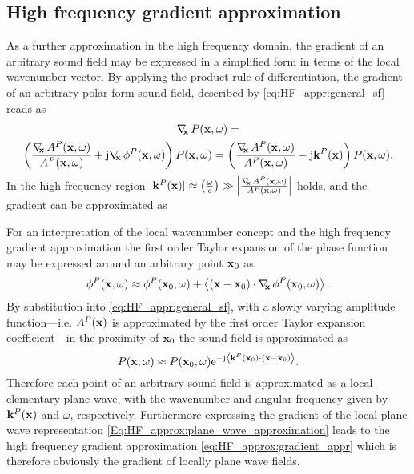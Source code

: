 \subsection{High frequency gradient approximation}
As a further approximation in the high frequency domain, the gradient of an arbitrary sound field may be expressed in a simplified form in terms of the local wavenumber vector.
By applying the product rule of differentiation, the gradient of an arbitrary polar form sound field, described by \eqref{eq:HF_appr:general_sf} reads as
\begin{multline}
\Dx P(\vx,\omega) = \\ \left(  \frac{\Dx A^P(\vx,\omega)}{A^P(\vx,\omega)} + \ti \Dx \phi^P(\vx,\omega) \right) P(\vx,\omega) =  \left(  \frac{\Dx A^P(\vx,\omega)}{A^P(\vx,\omega)} - \ti \vk^P(\vx) \right) P(\vx,\omega).
\end{multline}
In the high frequency region $|\mathbf{k}^P(\mathbf{x})| \approx \left( \frac{\omega}{c} \right) \gg \left| \frac{ \nabla_{\!\!\mathbf{x}}\, A^P(\mathbf{x},\omega)}{A^P(\mathbf{x},\omega)} \right|$ holds, and the gradient can be approximated as

\vspace{3mm}
For an interpretation of the local wavenumber concept and the high frequency gradient approximation the first order Taylor expansion of the phase function may be expressed around an arbitrary point $\mathbf{x}_0$ as
\begin{equation}
\phi^P(\mathbf{x},\omega) \approx \phi^P(\mathbf{x}_0,\omega) + \left< (\mathbf{x}-\mathbf{x}_0) \cdot \nabla_{\!\!\mathbf{x}}\, \phi^P(\mathbf{x}_0,\omega) \right>.
\end{equation}
By substitution into \eqref{eq:HF_appr:general_sf}, with a slowly varying amplitude function---i.e. $A^P(\mathbf{x})$ is approximated by the first order Taylor expansion coefficient---in the proximity of $\mathbf{x}_0$ the sound field is approximated as
\begin{equation}
\label{Eq:HF_approx:plane_wave_approximation}
P(\mathbf{x},\omega) \approx P(\mathbf{x}_0,\omega) \mathrm{e}^{-\mathrm{j}  \left< \mathbf{k}^P(\mathbf{x}_0) \cdot \left( \mathbf{x} - \mathbf{x}_0 \right) \right>}.
\end{equation}
Therefore each point of an arbitrary sound field is approximated as a local elementary plane wave, with the wavenumber and angular frequency given by $\mathbf{k}^P(\mathbf{x})$ and $\omega$, respectively.
Furthermore expressing the gradient of the local plane wave representation \eqref{Eq:HF_approx:plane_wave_approximation} leads to the high frequency gradient approximation \eqref{eq:HF_approx:gradient_appr} which is therefore obviously the gradient of locally plane wave fields.

